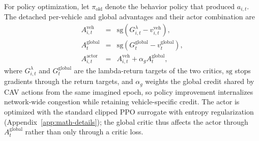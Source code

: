 For policy optimization, let \(\pi_{\mathrm{old}}\) denote the behavior
policy that produced \(a_{i,t}\).  The detached per-vehicle and global
advantages and their actor combination are
\begin{equation}
\begin{array}{rcl}
A_{i,t}^{\mathrm{veh}}
&=&
\mathrm{sg}\!\left(
G_{i,t}^{\lambda}-v_{i,t}^{\mathrm{veh}}
\right),\\
A_t^{\mathrm{global}}
&=&
\mathrm{sg}\!\left(
G_t^{\mathrm{global}}-v_t^{\mathrm{global}}
\right),\\
A_{i,t}^{\mathrm{actor}}
&=&
A_{i,t}^{\mathrm{veh}}+\alpha_g A_t^{\mathrm{global}},
\end{array}
\end{equation}
where \(G_{i,t}^{\lambda}\) and \(G_t^{\mathrm{global}}\) are the
lambda-return targets of the two critics, \(\mathrm{sg}\) stops gradients
through the return targets, and \(\alpha_g\) weights the global credit
shared by CAV actions from the same imagined epoch, so policy improvement
internalizes network-wide congestion while retaining vehicle-specific
credit.  The actor is optimized with the standard clipped PPO surrogate
with entropy regularization (Appendix~\ref{app:math-details}); the global
critic thus affects the actor through \(A_t^{\mathrm{global}}\) rather than
only through a critic loss.
